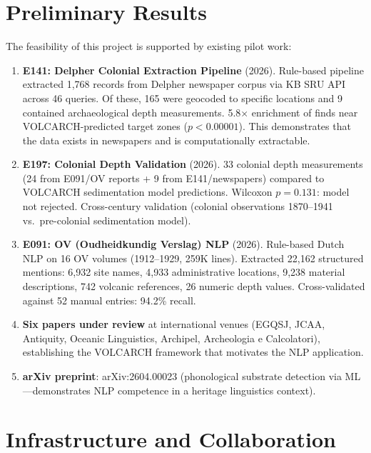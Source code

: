 \documentclass[11pt,a4paper]{article}
\begin{document}
\section{Preliminary Results}

The feasibility of this project is supported by existing pilot work:

\begin{enumerate}[nosep]
  \item \textbf{E141: Delpher Colonial Extraction Pipeline} (2026). Rule-based pipeline extracted 1,768 records from Delpher newspaper corpus via KB SRU API across 46 queries. Of these, 165 were geocoded to specific locations and 9 contained archaeological depth measurements. 5.8$\times$ enrichment of finds near VOLCARCH-predicted target zones ($p < 0.00001$). This demonstrates that the data exists in newspapers and is computationally extractable.
  \item \textbf{E197: Colonial Depth Validation} (2026). 33 colonial depth measurements (24 from E091/OV reports + 9 from E141/newspapers) compared to VOLCARCH sedimentation model predictions. Wilcoxon $p = 0.131$: model not rejected. Cross-century validation (colonial observations 1870--1941 vs.\ pre-colonial sedimentation model).
  \item \textbf{E091: OV (Oudheidkundig Verslag) NLP} (2026). Rule-based Dutch NLP on 16 OV volumes (1912--1929, 259K lines). Extracted 22,162 structured mentions: 6,932 site names, 4,933 administrative locations, 9,238 material descriptions, 742 volcanic references, 26 numeric depth values. Cross-validated against 52 manual entries: 94.2\% recall.
  \item \textbf{Six papers under review} at international venues (EGQSJ, JCAA, Antiquity, Oceanic Linguistics, Archipel, Archeologia e Calcolatori), establishing the VOLCARCH framework that motivates the NLP application.
  \item \textbf{arXiv preprint}: arXiv:2604.00023 (phonological substrate detection via ML---demonstrates NLP competence in a heritage linguistics context).
\end{enumerate}

\section{Infrastructure and Collaboration}
\end{document}

